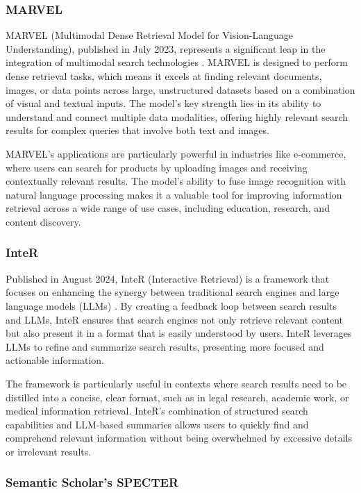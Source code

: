 \subsubsection{MARVEL}

MARVEL (Multimodal Dense Retrieval Model for Vision-Language Understanding), published in July 2023, represents a significant leap in the integration of multimodal search technologies \cite{MARVEL}. 
MARVEL is designed to perform dense retrieval tasks, which means it excels at finding relevant documents, images, or data points across large, unstructured datasets based on a combination of visual and textual inputs. 
The model's key strength lies in its ability to understand and connect multiple data modalities, offering highly relevant search results for complex queries that involve both text and images.

MARVEL's applications are particularly powerful in industries like e-commerce, where users can search for products by uploading images and receiving contextually relevant results. 
The model's ability to fuse image recognition with natural language processing makes it a valuable tool for improving information retrieval across a wide range of use cases, including education, research, and content discovery.

\subsubsection{InteR}

Published in August 2024, InteR (Interactive Retrieval) is a framework that focuses on enhancing the synergy between traditional search engines and large language models (LLMs) \cite{InteR}. 
By creating a feedback loop between search results and LLMs, InteR ensures that search engines not only retrieve relevant content but also present it in a format that is easily understood by users. 
InteR leverages LLMs to refine and summarize search results, presenting more focused and actionable information.

The framework is particularly useful in contexts where search results need to be distilled into a concise, clear format, such as in legal research, academic work, or medical information retrieval. 
InteR's combination of structured search capabilities and LLM-based summaries allows users to quickly find and comprehend relevant information without being overwhelmed by excessive details or irrelevant results.

\subsubsection{Semantic Scholar's SPECTER}

